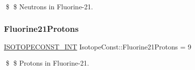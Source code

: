 \$ \$ Neutrons in Fluorine-\/21. \mbox{\label{group___isotope_const-_fluorine-_f21_ga7aa4f06e7709d49b04b2b4aabf0dc3d9}} 
\subsubsection{\texorpdfstring{Fluorine21\+Protons}{Fluorine21Protons}}
{\footnotesize\ttfamily \mbox{\hyperlink{group___isotope_const-_macros_ga5f18360b3e99483a35c32d789e62621c}{I\+S\+O\+T\+O\+P\+E\+C\+O\+N\+S\+T\+\_\+\+I\+NT}} Isotope\+Const\+::\+Fluorine21\+Protons = 9}

\$ \$ Protons in Fluorine-\/21. 